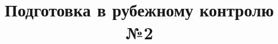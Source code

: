 \documentclass[a4paper]{article}
\begin{document}
  \title{Подготовка в рубежному контролю №2}
   
\end{document}
